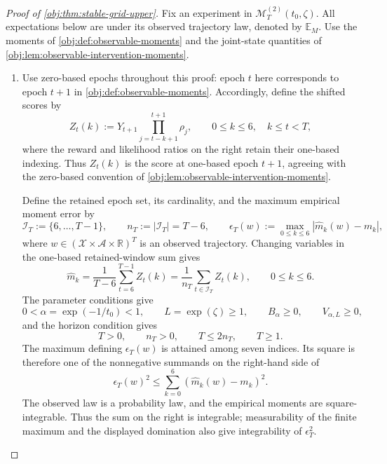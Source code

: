 \begin{proof}[Proof of \cref{obj:thm:stable-grid-upper}]
Fix an experiment in \(\mathcal M_T^{(2)}(t_0,\zeta)\). All expectations below are under its observed trajectory law, denoted by \(\mathbb E_M\). Use the moments of \cref{obj:def:observable-moments} and the joint-state quantities of \cref{obj:lem:observable-intervention-moments}.

\begin{enumerate}
\item Use zero-based epochs throughout this proof: epoch \(t\) here corresponds to epoch \(t+1\) in \cref{obj:def:observable-moments}. Accordingly, define the shifted scores by
\[
Z_t(k):=Y_{t+1}\prod_{j=t-k+1}^{t+1}\rho_j,
\qquad 0\le k\le6,\quad k\le t<T,
\]
where the reward and likelihood ratios on the right retain their one-based indexing. Thus \(Z_t(k)\) is the score at one-based epoch \(t+1\), agreeing with the zero-based convention of \cref{obj:lem:observable-intervention-moments}.

Define the retained epoch set, its cardinality, and the maximum empirical moment error by
\[
\mathcal I_T:=\{6,\ldots,T-1\},
\qquad
n_T:=|\mathcal I_T|=T-6,
\qquad
\epsilon_T(w):=
\max_{0\le k\le6}|\widehat m_k(w)-m_k|,
\]
where \(w\in(\mathcal X\times\mathcal A\times\mathbb R)^T\) is an observed trajectory. Changing variables in the one-based retained-window sum gives
\[
\widehat m_k
=
\frac1{T-6}\sum_{t=6}^{T-1}Z_t(k)
=
\frac1{n_T}\sum_{t\in\mathcal I_T}Z_t(k),
\qquad 0\le k\le6.
\]
The parameter conditions give
\[
0<\alpha=\exp(-1/t_0)<1,
\qquad
L=\exp(\zeta)\ge1,
\qquad
B_\alpha\ge0,
\qquad
V_{\alpha,L}\ge0,
\]
and the horizon condition gives
\[
T>0,\qquad n_T>0,\qquad T\le2n_T,\qquad T\ge1.
\]
The maximum defining \(\epsilon_T(w)\) is attained among seven indices. Its square is therefore one of the nonnegative summands on the right-hand side of
\[
\epsilon_T(w)^2
\le
\sum_{k=0}^{6}(\widehat m_k(w)-m_k)^2.
\]
The observed law is a probability law, and the empirical moments are square-integrable. Thus the sum on the right is integrable; measurability of the finite maximum and the displayed domination also give integrability of \(\epsilon_T^2\).


\end{enumerate}
\end{proof}
